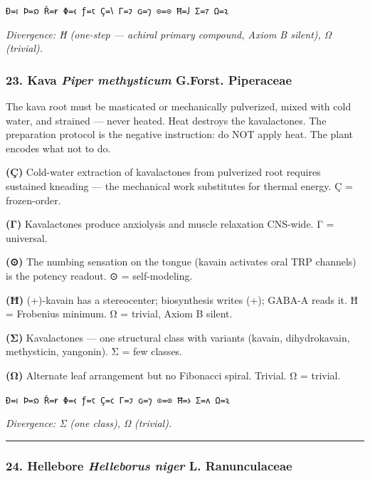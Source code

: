 \texttt{Ð=𐑦\ Þ=𐑸\ Ř=𐑾\ Φ=𐑬\ ƒ=𐑱\ Ç=𐑘\ Γ=𐑲\ ɢ=𐑠\ ⊙=⊙\ Ħ=𐑓\ Σ=𐑳\ Ω=𐑷}

\emph{Divergence: Ħ (one-step --- achiral primary compound, Axiom B
silent), Ω (trivial).}

\hypertarget{kava-piper-methysticum-g.forst.-piperaceae}{%
\subsubsection{\texorpdfstring{23. Kava \textbar{} \emph{Piper
methysticum} G.Forst. \textbar{}
Piperaceae}{23. Kava \textbar{} Piper methysticum G.Forst. \textbar{} Piperaceae}}\label{kava-piper-methysticum-g.forst.-piperaceae}}

The kava root must be masticated or mechanically pulverized, mixed with
cold water, and strained --- never heated. Heat destroys the
kavalactones. The preparation protocol is the negative instruction: do
NOT apply heat. The plant encodes what not to do.

\textbf{(Ç)} Cold-water extraction of kavalactones from pulverized root
requires sustained kneading --- the mechanical work substitutes for
thermal energy. Ç = frozen-order.

\textbf{(Γ)} Kavalactones produce anxiolysis and muscle relaxation
CNS-wide. Γ = universal.

\textbf{(⊙)} The numbing sensation on the tongue (kavain activates oral
TRP channels) is the potency readout. ⊙ = self-modeling.

\textbf{(Ħ)} (+)-kavain has a stereocenter; biosynthesis writes (+);
GABA-A reads it. Ħ = Frobenius minimum. Ω = trivial, Axiom B silent.

\textbf{(Σ)} Kavalactones --- one structural class with variants
(kavain, dihydrokavain, methysticin, yangonin). Σ = few classes.

\textbf{(Ω)} Alternate leaf arrangement but no Fibonacci spiral.
Trivial. Ω = trivial.

\texttt{Ð=𐑦\ Þ=𐑸\ Ř=𐑾\ Φ=𐑬\ ƒ=𐑱\ Ç=𐑤\ Γ=𐑲\ ɢ=𐑠\ ⊙=⊙\ Ħ=𐑶\ Σ=𐑵\ Ω=𐑷}

\emph{Divergence: Σ (one class), Ω (trivial).}

\begin{center}\rule{0.5\linewidth}{0.5pt}\end{center}

\hypertarget{hellebore-helleborus-niger-l.-ranunculaceae}{%
\subsubsection{\texorpdfstring{24. Hellebore \textbar{} \emph{Helleborus
niger} L. \textbar{}
Ranunculaceae}{24. Hellebore \textbar{} Helleborus niger L. \textbar{} Ranunculaceae}}\label{hellebore-helleborus-niger-l.-ranunculaceae}}

